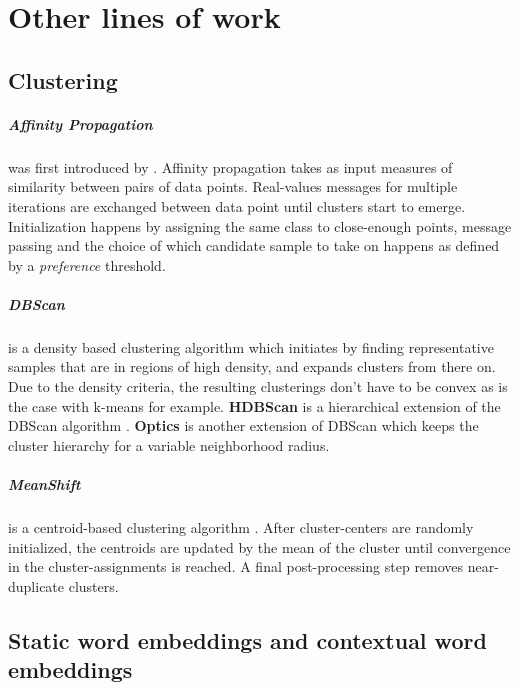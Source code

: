 \documentclass[a4paper,12pt,oneside,openright]{report}
\begin{document}
\chapter{Other lines of work}

\section{Clustering}\label{appendix:Clustering}

\paragraph{Affinity Propagation} was first introduced by \cite{frey07}.
Affinity propagation takes as input measures of similarity between pairs of data points. 
Real-values messages for multiple iterations are exchanged between data point until clusters start to emerge.
Initialization happens by assigning the same class to close-enough points, message passing and the choice of which candidate sample to take on happens as defined by a \textit{preference} threshold.

\paragraph{DBScan} is a density based clustering algorithm \cite{ester96} which initiates by finding representative samples that are in regions of high density, and expands clusters from there on.
Due to the density criteria, the resulting clusterings don't have to be convex as is the case with k-means for example. \textbf{HDBScan} is a hierarchical extension of the DBScan algorithm \cite{campello13}. \textbf{Optics} \cite{mihael99} is another extension of DBScan which keeps the cluster hierarchy for a variable neighborhood radius.

\paragraph{MeanShift} is a centroid-based clustering algorithm \cite{comaniciu02}.
After cluster-centers are randomly initialized, the centroids are updated by the mean of the cluster until convergence in the cluster-assignments is reached.
A final post-processing step removes near-duplicate clusters.


\section{Static word embeddings and contextual word embeddings}
\end{document}
